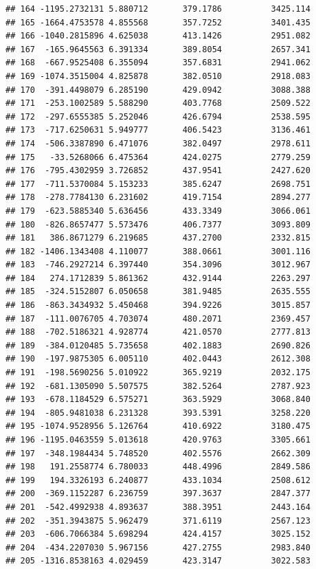 \documentclass[
]{article}
\begin{document}
\begin{verbatim}
## 164 -1195.2732131 5.880712       379.1786          3425.114
## 165 -1664.4753578 4.855568       357.7252          3401.435
## 166 -1040.2815896 4.625038       413.1426          2951.082
## 167  -165.9645563 6.391334       389.8054          2657.341
## 168  -667.9525408 6.355094       357.6831          2941.062
## 169 -1074.3515004 4.825878       382.0510          2918.083
## 170  -391.4498079 6.285190       429.0942          3088.388
## 171  -253.1002589 5.588290       403.7768          2509.522
## 172  -297.6555385 5.252046       426.6794          2538.595
## 173  -717.6250631 5.949777       406.5423          3136.461
## 174  -506.3387890 6.471076       382.0497          2978.611
## 175   -33.5268066 6.475364       424.0275          2779.259
## 176  -795.4302959 3.726852       437.9541          2427.620
## 177  -711.5370084 5.153233       385.6247          2698.751
## 178  -278.7784130 6.231602       419.7154          2894.277
## 179  -623.5885340 5.636456       433.3349          3066.061
## 180  -826.8657477 5.573476       406.7377          3093.809
## 181   386.8671279 6.219685       437.2700          2332.815
## 182 -1406.1343408 4.110077       388.0661          3001.116
## 183  -746.2927214 6.397440       354.3096          3012.967
## 184   274.1712839 5.861362       432.9144          2263.297
## 185  -324.5152807 6.050658       381.9485          2635.555
## 186  -863.3434932 5.450468       394.9226          3015.857
## 187  -111.0076705 4.703074       480.2071          2369.457
## 188  -702.5186321 4.928774       421.0570          2777.813
## 189  -384.0120485 5.735658       402.1883          2690.826
## 190  -197.9875305 6.005110       402.0443          2612.308
## 191  -198.5690256 5.010922       365.9219          2032.175
## 192  -681.1305090 5.507575       382.5264          2787.923
## 193  -678.1184529 6.575271       363.5929          3068.840
## 194  -805.9481038 6.231328       393.5391          3258.220
## 195 -1074.9528956 5.126764       410.6922          3180.475
## 196 -1195.0463559 5.013618       420.9763          3305.661
## 197  -348.1984434 5.748520       402.5576          2662.309
## 198   191.2558774 6.780033       448.4996          2849.586
## 199   194.3326193 6.240877       433.1034          2508.612
## 200  -369.1152287 6.236759       397.3637          2847.377
## 201  -542.4992938 4.893637       388.3951          2443.164
## 202  -351.3943875 5.962479       371.6119          2567.123
## 203  -606.7066384 5.698294       424.4157          3025.152
## 204  -434.2207030 5.967156       427.2755          2983.840
## 205 -1316.8538163 4.029459       423.3147          3022.583

\end{verbatim}
\end{document}

